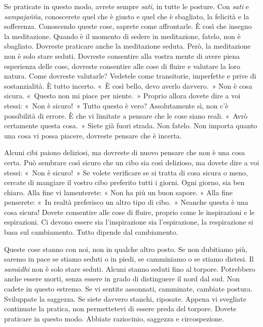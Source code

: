 Se praticate in questo modo, avrete sempre \emph{sati}, in tutte le
posture. Con \emph{sati} e \emph{sampajañña}, conoscerete quel che è
giusto e quel che è sbagliato, la felicità e la sofferenza. Conoscendo
queste cose, saprete come affrontarle. È così che insegno la
meditazione. Quando è il momento di sedere in meditazione, fatelo, non è
sbagliato. Dovreste praticare anche la meditazione seduta. Però, la
meditazione non è solo stare seduti. Dovreste consentire alla vostra
mente di avere piena esperienza delle cose, dovreste consentire alle
cose di fluire e valutare la loro natura. Come dovreste valutarle?
Vedetele come transitorie, imperfette e prive di sostanzialità. È tutto
incerto. «~È così bello, devo averlo davvero.~» Non è cosa sicura.
«~Questo non mi piace per niente.~» Proprio allora dovete dire a voi
stessi: «~Non è sicuro!~» Tutto questo è vero? Assolutamente sì, non c'è
possibilità di errore. È che vi limitate a pensare che le cose siano
reali. «~Avrò certamente questa cosa.~» Siete già fuori strada. Non
fatelo. Non importa quanto una cosa vi possa piacere, dovreste pensare
che è incerta.

Alcuni cibi paiono deliziosi, ma dovreste di nuovo pensare che non è una
cosa certa. Può sembrare così sicuro che un cibo sia così delizioso, ma
dovete dire a voi stessi: «~Non è sicuro!~» Se volete verificare se si
tratta di cosa sicura o meno, cercate di mangiare il vostro cibo
preferito tutti i giorni. Ogni giorno, sia ben chiaro. Alla fine vi
lamenterete: « Non ha più un buon sapore. » Alla fine penserete: «~In
realtà preferisco un altro tipo di cibo.~» Neanche questa è una cosa
sicura! Dovete consentire alle cose di fluire, proprio come le
inspirazioni e le espirazioni. Ci devono essere sia l'inspirazione sia
l'espirazione, la respirazione si basa sul cambiamento. Tutto dipende
dal cambiamento.

Queste cose stanno con noi, non in qualche altro posto. Se non dubitiamo
più, saremo in pace se stiamo seduti o in piedi, se camminiamo o se
stiamo distesi. Il \emph{samādhi} non è solo stare seduti. Alcuni stanno
seduti fino al torpore. Potrebbero anche essere morti, senza essere in
grado di distinguere il nord dal sud. Non cadete in questo estremo. Se
vi sentite assonnati, camminate, cambiate postura. Sviluppate la
saggezza. Se siete davvero stanchi, riposate. Appena vi svegliate
continuate la pratica, non permettetevi di essere preda del torpore.
Dovete praticare in questo modo. Abbiate raziocinio, saggezza e
circospezione.

